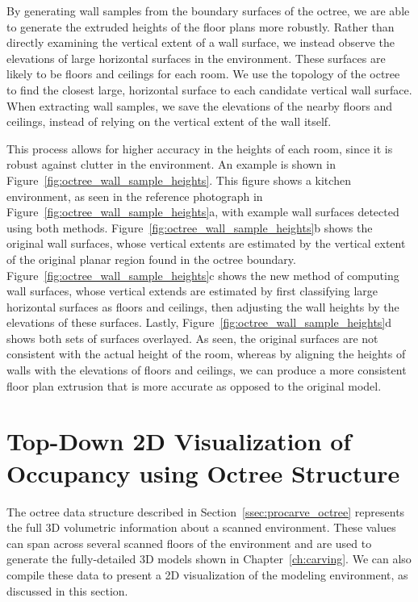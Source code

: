 \documentclass[12pt,onecolumn,oneside]{book}
\begin{document}
By generating wall samples from the boundary surfaces of the octree, we are able to generate the extruded heights of the floor plans more robustly.  Rather than directly examining the vertical extent of a wall surface, we instead observe the elevations of large horizontal surfaces in the environment.  These surfaces are likely to be floors and ceilings for each room.  We use the topology of the octree to find the closest large, horizontal surface to each candidate vertical wall surface.  When extracting wall samples, we save the elevations of the nearby floors and ceilings, instead of relying on the vertical extent of the wall itself.

This process allows for higher accuracy in the heights of each room, since it is robust against clutter in the environment.  An example is shown in Figure~\ref{fig:octree_wall_sample_heights}.  This figure shows a kitchen environment, as seen in the reference photograph in Figure~\ref{fig:octree_wall_sample_heights}a, with example wall surfaces detected using both methods.  Figure~\ref{fig:octree_wall_sample_heights}b shows the original wall surfaces, whose vertical extents are estimated by the vertical extent of the original planar region found in the octree boundary.  Figure~\ref{fig:octree_wall_sample_heights}c shows the new method of computing wall surfaces, whose vertical extends are estimated by first classifying large horizontal surfaces as floors and ceilings, then adjusting the wall heights by the elevations of these surfaces.  Lastly, Figure~\ref{fig:octree_wall_sample_heights}d shows both sets of surfaces overlayed.  As seen, the original surfaces are not consistent with the actual height of the room, whereas by aligning the heights of walls with the elevations of floors and ceilings, we can produce a more consistent floor plan extrusion that is more accurate as opposed to the original model.

\FloatBarrier
\section{Top-Down 2D Visualization of Occupancy using Octree Structure}
\label{ssec:hia}

The octree data structure described in Section~\ref{ssec:procarve_octree} represents the full 3D volumetric information about a scanned environment.  These values can span across several scanned floors of the environment and are used to generate the fully-detailed 3D models shown in Chapter~\ref{ch:carving}.  We can also compile these data to present a 2D visualization of the modeling environment, as discussed in this section.
\end{document}
